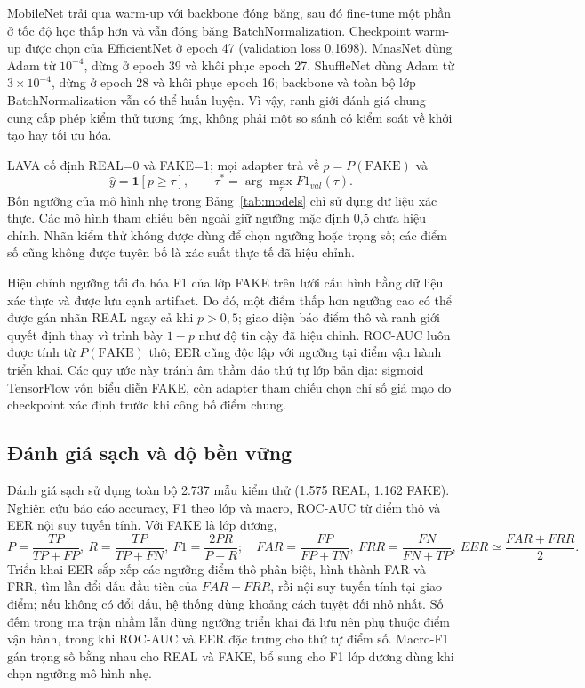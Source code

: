 \documentclass[10pt,journal,onecolumn,a4paper]{IEEEtran}
\begin{document}
MobileNet trải qua warm-up với backbone đóng băng, sau đó fine-tune một phần ở tốc độ học thấp hơn và vẫn đóng băng BatchNormalization. Checkpoint warm-up được chọn của EfficientNet ở epoch 47 (validation loss 0,1698). MnasNet dùng Adam từ $10^{-4}$, dừng ở epoch 39 và khôi phục epoch 27. ShuffleNet dùng Adam từ $3\times10^{-4}$, dừng ở epoch 28 và khôi phục epoch 16; backbone và toàn bộ lớp BatchNormalization vẫn có thể huấn luyện. Vì vậy, ranh giới đánh giá chung cung cấp phép kiểm thử tương ứng, không phải một so sánh có kiểm soát về khởi tạo hay tối ưu hóa.

LAVA cố định REAL=0 và FAKE=1; mọi adapter trả về $p=P(\mathrm{FAKE})$ và
\begin{equation}
\hat y=\mathbf{1}[p\ge\tau],\qquad \tau^*=\arg\max_{\tau}F1_{val}(\tau).
\label{eq:decision}
\end{equation}
Bốn ngưỡng của mô hình nhẹ trong Bảng~\ref{tab:models} chỉ sử dụng dữ liệu xác thực. Các mô hình tham chiếu bên ngoài giữ ngưỡng mặc định 0,5 chưa hiệu chỉnh. Nhãn kiểm thử không được dùng để chọn ngưỡng hoặc trọng số; các điểm số cũng không được tuyên bố là xác suất thực tế đã hiệu chỉnh.

Hiệu chỉnh ngưỡng tối đa hóa F1 của lớp FAKE trên lưới cấu hình bằng dữ liệu xác thực và được lưu cạnh artifact. Do đó, một điểm thấp hơn ngưỡng cao có thể được gán nhãn REAL ngay cả khi $p>0,5$; giao diện báo điểm thô và ranh giới quyết định thay vì trình bày $1-p$ như độ tin cậy đã hiệu chỉnh. ROC-AUC luôn được tính từ $P(\mathrm{FAKE})$ thô; EER cũng độc lập với ngưỡng tại điểm vận hành triển khai. Các quy ước này tránh âm thầm đảo thứ tự lớp bản địa: sigmoid TensorFlow vốn biểu diễn FAKE, còn adapter tham chiếu chọn chỉ số giả mạo do checkpoint xác định trước khi công bố điểm chung.

\subsection{Đánh giá sạch và độ bền vững}
Đánh giá sạch sử dụng toàn bộ 2.737 mẫu kiểm thử (1.575 REAL, 1.162 FAKE). Nghiên cứu báo cáo accuracy, F1 theo lớp và macro, ROC-AUC từ điểm thô và EER nội suy tuyến tính. Với FAKE là lớp dương,
\begin{equation}
P=\frac{TP}{TP+FP},\ R=\frac{TP}{TP+FN},\ F1=\frac{2PR}{P+R};\quad FAR=\frac{FP}{FP+TN},\ FRR=\frac{FN}{FN+TP},\ EER\simeq\frac{FAR+FRR}{2}.
\label{eq:metrics}
\end{equation}
Triển khai EER sắp xếp các ngưỡng điểm thô phân biệt, hình thành FAR và FRR, tìm lần đổi dấu đầu tiên của $FAR-FRR$, rồi nội suy tuyến tính tại giao điểm; nếu không có đổi dấu, hệ thống dùng khoảng cách tuyệt đối nhỏ nhất. Số đếm trong ma trận nhầm lẫn dùng ngưỡng triển khai đã lưu nên phụ thuộc điểm vận hành, trong khi ROC-AUC và EER đặc trưng cho thứ tự điểm số. Macro-F1 gán trọng số bằng nhau cho REAL và FAKE, bổ sung cho F1 lớp dương dùng khi chọn ngưỡng mô hình nhẹ.
\end{document}
